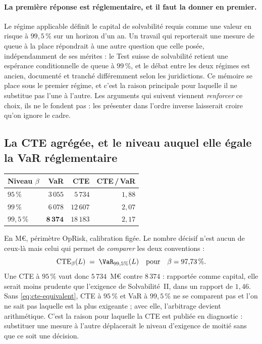 \paragraph{La première réponse est réglementaire, et il faut la donner en premier.} Le régime
applicable définit le capital de solvabilité requis comme une valeur en risque à
$99{,}5\,\%$ sur un horizon d'un an. Un travail qui reporterait une mesure de queue à la place
répondrait à une autre question que celle posée, indépendamment de ses mérites : le Test suisse
de solvabilité retient une espérance conditionnelle de queue à $99\,\%$, et le débat entre les
deux régimes est ancien, documenté et tranché différemment selon les juridictions. Ce mémoire se
place sous le premier régime, et c'est la raison principale pour laquelle il ne substitue pas
l'une à l'autre. Les arguments qui suivent viennent \emph{renforcer} ce choix, ils ne le
fondent pas : les présenter dans l'ordre inverse laisserait croire qu'on ignore le cadre.

\subsection*{La CTE agrégée, et le niveau auquel elle égale la VaR réglementaire}

\begin{center}\footnotesize
\renewcommand{\arraystretch}{1.25}
\begin{tabular}{@{}l r r r@{}}
\toprule
\textbf{Niveau $\beta$} & \textbf{VaR} & \textbf{CTE} & \textbf{CTE\,/\,VaR} \\
\midrule
$95\,\%$ & $3\,055$ & $5\,734$ & $1{,}88$ \\
$99\,\%$ & $6\,078$ & $12\,607$ & $2{,}07$ \\
$99{,}5\,\%$ & $\mathbf{8\,374}$ & $18\,183$ & $2{,}17$ \\
\bottomrule
\end{tabular}
\end{center}

\vspace{4pt}
\noindent En M\euro, périmètre OpRisk, calibration figée. Le nombre décisif n'est aucun de ceux-là
mais celui qui permet de \emph{comparer} les deux conventions :
\begin{equation}
  \mathrm{CTE}_\beta(L) \;=\; \VaR_{99{,}5\%}(L) \quad\text{pour}\quad \beta = 97{,}73\,\%.
  \label{eq:cte-equivalent}
\end{equation}
Une CTE à $95\,\%$ vaut donc $5\,734$~M\euro{} contre $8\,374$ : rapportée comme capital, elle
serait moins prudente que l'exigence de Solvabilité~II, dans un rapport de $1{,}46$. Sans
\eqref{eq:cte-equivalent}, \og CTE à $95\,\%$\fg{} et \og VaR à $99{,}5\,\%$\fg{} ne se comparent pas et l'on
ne sait pas laquelle est la plus exigeante ; avec elle, l'arbitrage devient arithmétique. C'est la
raison pour laquelle la CTE est publiée en diagnostic : substituer une mesure à l'autre
déplacerait le niveau d'exigence de moitié sans que ce soit une décision.

